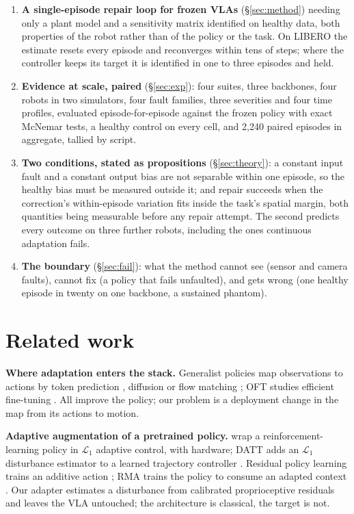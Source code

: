 \documentclass{article}
\begin{document}
\begin{enumerate}[leftmargin=1.5em,itemsep=1pt]
\item \textbf{A single-episode repair loop for frozen VLAs} (\S\ref{sec:method}) needing
  only a plant model and a sensitivity matrix identified on healthy data, both properties of
  the robot rather than of the policy or the task. On LIBERO the estimate resets every
  episode and reconverges within tens of steps; where the controller keeps its target it
  is identified in one to three episodes and held.
\item \textbf{Evidence at scale, paired} (\S\ref{sec:exp}): four suites, three backbones, four
  robots in two simulators, four fault families, three severities and four time profiles,
  evaluated episode-for-episode against the frozen policy with exact McNemar tests, a
  healthy control on every cell, and 2,240 paired episodes in aggregate, tallied by script.
\item \textbf{Two conditions, stated as propositions} (\S\ref{sec:theory}): a constant input
  fault and a constant output bias are not separable within one episode, so the healthy
  bias must be measured outside it; and repair succeeds when the correction's
  within-episode variation fits inside the task's spatial margin, both quantities being
  measurable before any repair attempt. The second predicts every outcome on three
  further robots, including the ones continuous adaptation fails.
\item \textbf{The boundary} (\S\ref{sec:fail}): what the method cannot see (sensor and camera
  faults), cannot fix (a policy that fails unfaulted), and gets wrong (one healthy episode
  in twenty on one backbone, a sustained phantom).
\end{enumerate}

\section{Related work}
\label{sec:related}

\textbf{Where adaptation enters the stack.} Generalist policies map observations to actions
by token prediction \citep{rt2,openvla}, diffusion \citep{diffusionpolicy,octo} or flow
matching \citep{pi0,pi05}; OFT studies efficient fine-tuning \citep{openvlaoft}. All improve
the policy; our problem is a deployment change in the map from its actions to motion.

\textbf{Adaptive augmentation of a pretrained policy.} \citet{cheng2022l1rl} wrap a
reinforcement-learning policy in $\mathcal L_1$ adaptive control, with hardware; DATT adds an
$\mathcal L_1$ disturbance estimator to a learned trajectory controller \citep{huang2023datt}.
Residual policy learning trains an additive action \citep{silver2018residual,johannink2019residual};
RMA trains the policy to consume an adapted context \citep{kumar2021rma}. Our adapter estimates
a disturbance from calibrated proprioceptive residuals and leaves the VLA untouched; the
architecture is classical, the target is not.
\end{document}

